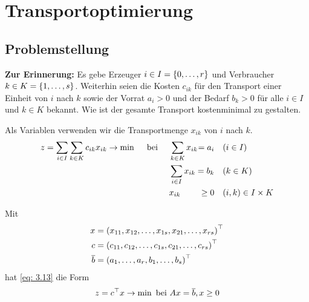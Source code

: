 \section{Transportoptimierung}

\subsection{Problemstellung}

\textbf{Zur Erinnerung:}
Es gebe Erzeuger $i \in I = \left\{ 0, \dots, r \right\}$ und Verbraucher $k \in K = \left\{ 1, \dots, s \right\}$. Weiterhin seien die Kosten $c_{ik}$ für den Transport einer Einheit von $i$ nach $k$ sowie der Vorrat $a_i > 0$ und der Bedarf $b_k > 0$ für alle $i \in I$ und $k \in K$ bekannt. Wie ist der gesamte Transport kostenminimal zu gestalten.

Als Variablen verwenden wir die Transportmenge $x_{ik}$ von $i$ nach $k$.
\begin{equation}
\begin{alignedat}{3}
	z = \sum_{i \in I} \sum_{k \in K} c_{ik} x_{ik} \to \min \quad \text{ bei } \quad 
	&\sum_{k \in K} x_{ik} &= a_i \quad &(i \in I) \\
	&\sum_{i \in I} x_{ik} &= b_k \quad &(k \in K) \\
	& x_{ik} &\ge 0 \quad &(i,k) \in I \times K \\
\end{alignedat}
\label{eq: 3.13}
\end{equation}

Mit   
\begin{equation*}
	\begin{aligned}
		x &= \left( x_{11}, x_{12}, \dots, x_{1s}, x_{21}, \dots, x_{rs} \right)^{\top} \\
		c &= \left( c_{11}, c_{12}, \dots, c_{1s}, c_{21}, \dots, c_{rs} \right)^{\top} \\
		\overline{b} &= \left( a_1, \dots, a_r, b_1, \dots, b_s \right)^{\top}
	\end{aligned}
\end{equation*}
hat \eqref{eq: 3.13} die Form
\begin{equation*}
	z = c^{\top} x \to \min \text{ bei } Ax = \overline{b}, x \ge 0
\end{equation*}

